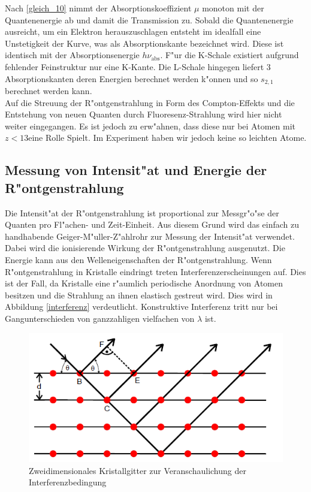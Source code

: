 		Nach \eqref{gleich_10} nimmt der Absorptionskoeffizient $\mu$ monoton mit der Quantenenergie ab und damit die Transmission zu.
		Sobald die Quantenenergie ausreicht, um ein Elektron he\-raus\-zu\-schla\-gen entsteht im idealfall eine Unstetigkeit der Kurve, was als Absorptionskante bezeichnet wird.
		Diese ist identisch mit der Ab\-sorp\-tions\-e\-nergie $h\nu_\mathrm{abs}$.
		F"ur die K-Schale existiert aufgrund fehlender Feinstruktur nur eine K-Kante.
		Die L-Schale hingegen liefert 3 Ab\-sorp\-tions\-kan\-ten deren Energien berechnet werden k"onnen und so $s_{2,1}$ berechnet werden kann.\\
		Auf die Streuung der R"ontgenstrahlung in Form des Compton-Effekts und die Entstehung von neuen Quanten durch Fluoresenz-Strahlung wird hier nicht weiter eingegangen. Es ist jedoch zu erw"ahnen, dass diese nur bei Atomen mit $z < 13$eine Rolle Spielt.
		Im Experiment haben wir jedoch keine so leichten Atome.

	\subsection{Messung von Intensit"at und Energie der R"ontgenstrahlung} 
	\label{sub:messung_von_intensit_at_}
	
	Die Intensit"at der R"ontgenstrahlung ist proportional zur Messgr"o"se der Quanten pro Fl"achen- und Zeit-Einheit.
	Aus diesem Grund wird das einfach zu handhabende Geiger-M"uller-Z"ahlrohr zur Messung der Intensit"at verwendet. Dabei wird die ionisierende Wirkung der R"ontgenstrahlung ausgenutzt.
	Die Energie kann aus den Welleneigenschaften der R"ontgenstrahlung.
	Wenn R"ontgenstrahlung in Kristalle eindringt treten In\-ter\-fe\-renz\-er\-schei\-nung\-en auf.
	Dies ist der Fall, da Kristalle eine r"aumlich periodische Anordnung von Atomen besitzen und die Strahlung an ihnen elastisch gestreut wird. Dies wird in Abbildung \eqref{interferenz} verdeutlicht. Konstruktive Interferenz tritt nur bei Gangunterschieden von ganzzahligen vielfachen von $\lambda$ ist.

	\begin{figure}[htbp]
		\centering
		\includegraphics[width = 12cm]{img/interferenz.PNG}
		\caption{Zweidimensionales Kristallgitter zur Veranschaulichung der Interferenzbedingung}
		\label{interferenz}
	\end{figure}

